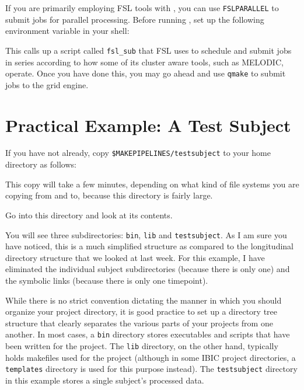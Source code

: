 If you are primarily employing FSL tools with \maken{}, you can use \texttt{FSLPARALLEL} to submit jobs for parallel processing. Before running \maken{}, set up the following environment variable in your shell:

This calls up a script called \texttt{fsl_sub} that FSL uses to schedule and submit jobs in series according to how some of its cluster aware tools, such as MELODIC, operate. Once you have done this, you may go ahead and use \texttt{qmake} to submit jobs to the grid engine. 

\section{Practical Example: A Test Subject}
If you have not already, copy \texttt{\$MAKEPIPELINES/testsubject} to your home directory as follows:

This copy will take a few minutes, depending on what kind of file systems you are copying from and to, because this directory is fairly large.

Go into this directory and look at its contents.

You will see three subdirectories: \texttt{bin}, \texttt{lib} and \texttt{testsubject}. 
As I am sure you have noticed, this is a much simplified structure as compared to the longitudinal directory structure that we looked at last week. For this example, I have eliminated the individual subject subdirectories (because there is only one) and the symbolic links (because there is only one timepoint). 

While there is no strict convention dictating the manner in which you should organize your project directory, it is good practice to set up a directory tree structure that clearly separates the various parts of your projects from one another. In most cases, a \texttt{bin} directory stores executables and scripts that have been written for the project. The \texttt{lib} directory, on the other hand, typically holds makefiles used for the project (although in some IBIC project directories, a \texttt{templates} directory is used for this purpose instead). The \texttt{testsubject} directory in this example stores a single subject's processed data.

